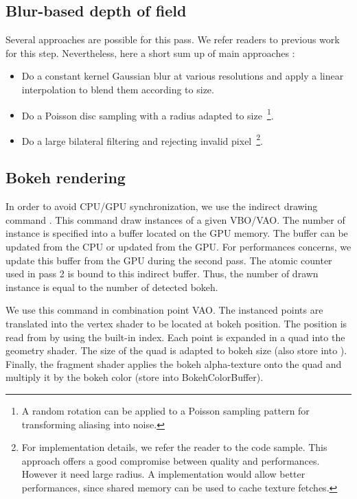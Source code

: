 \subsection{Blur-based depth of field}
Several approaches are possible for this pass. We refer readers to previous work for this step. Nevertheless, here a short sum up of main approaches :
\begin{itemize}
	\item Do a constant kernel Gaussian blur at various resolutions and apply a linear interpolation to blend them according to \coc size.
	\item Do a Poisson disc sampling with a radius adapted to \coc size~\footnote{A random rotation can be applied to a Poisson sampling pattern for transforming aliasing into noise.}.
	\item Do a large bilateral filtering and rejecting invalid pixel~\footnote{For implementation details, we refer the reader to the code sample. This approach offers a good compromise between quality and performances. However it need large radius. A \opencl implementation would allow better performances, since shared memory can be used to cache texture fetches.}.
\end{itemize}


\subsection{Bokeh rendering}
In order to avoid CPU/GPU synchronization, we use the indirect drawing command . This command draw instances of a given VBO/VAO. The number of instance is specified into a buffer located on the GPU memory. The buffer can be updated from the CPU or updated from the GPU. For performances concerns, we update this buffer from the GPU during the second pass. The atomic counter used in pass 2 is bound to this indirect buffer. Thus, the number of drawn instance is equal to the number of detected bokeh.

We use this command in combination point VAO. The instanced points are translated into the vertex shader to be located at bokeh position. The position is read from  by using the built-in  index. Each point is expanded in a quad into the geometry shader. The size of the quad is adapted to bokeh size (also store into ). Finally, the fragment shader applies the bokeh alpha-texture onto the quad and multiply it by the bokeh color (store into BokehColorBuffer).

